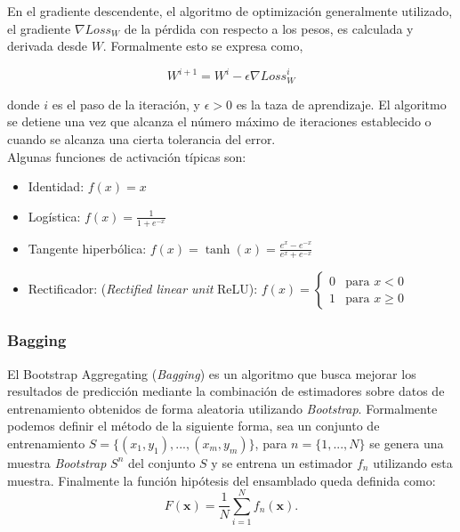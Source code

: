 \documentclass[spanish]{article}
\begin{document}
                En el gradiente descendente, el algoritmo de optimización generalmente utilizado, el gradiente $\nabla Loss_{W}$  de la pérdida con respecto a los pesos, 
                es calculada y derivada desde $W$. Formalmente esto se expresa como,

                \begin{equation}
                    W^{i+1} = W^i - \epsilon \nabla {Loss}_{W}^{i}
                \end{equation}
                    
                donde $i$ es el paso de la iteración, y $\epsilon > 0$ es la taza de aprendizaje. El algoritmo se detiene una vez que alcanza el número máximo de iteraciones
                establecido o cuando se alcanza una cierta tolerancia del error. \\
                
                Algunas funciones de activación típicas son:
                \begin{itemize}
                    \item Identidad: $f(x)=x$
                    \item Logística: $f(x)=\frac{1}{1+e^{-x}}$
                    \item Tangente hiperbólica: $f(x)=\tanh(x)=\frac{e^x - e^{-x}}{e^x + e^{-x}}$
                    \item Rectificador: (\emph{Rectified linear unit} ReLU): $f(x)=\begin{cases} 0 & \text{para } x < 0 \\ 1 & \text{para } x \geq 0 \end{cases}$ 
                \end{itemize}
                
            
            \subsubsection{Bagging}
            
                El Bootstrap Aggregating (\emph{Bagging}) es un algoritmo que busca mejorar los resultados de predicción mediante la combinación
                de estimadores sobre datos de entrenamiento obtenidos de forma aleatoria utilizando \emph{Bootstrap}. Formalmente podemos
                definir el método de la siguiente forma, sea un conjunto de entrenamiento $S=\{(x_1, y_1), ...,  (x_m, y_m)\}$, para $n=\{1, ..., N\}$
                se genera una muestra \emph{Bootstrap} $S^n$ del conjunto $S$ y se entrena un estimador $f_n$ utilizando esta muestra. Finalmente 
                la función hipótesis del ensamblado queda definida como:
                \begin{equation}
                    F(\textbf{x}) = \frac1N \sum_{i=1}^N f_n(\textbf{x}).
                \end{equation}
                
\end{document}
